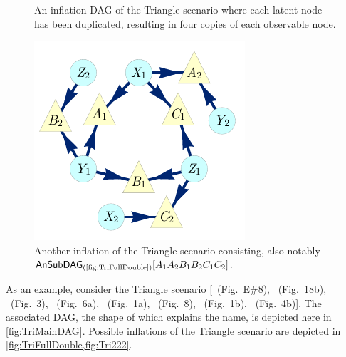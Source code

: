 \begin{figure}[t]
\begin{minipage}[t]{0.38\linewidth}
\caption{An inflation DAG of the Triangle scenario where each latent node has been duplicated, resulting in four copies of each observable node.}\label{fig:TriFullDouble}
\end{minipage}
\hfill
\begin{minipage}[b]{0.35\linewidth}
\centering
\includegraphics[scale=1]{TriDagSub222.pdf}
\caption{Another inflation of the Triangle scenario consisting, also notably $\ansubgraph[(\textrm{\cref{fig:TriFullDouble}})]{A_1 A_2 B_1 B_2 C_1 C_2}$.}\label{fig:Tri222}
\end{minipage}
\end{figure}



As an example, consider the Triangle scenario [\citealp{pusey2014gdag}~(Fig.~E\#8), \citealp{WoodSpekkens}~(Fig.~18b), \citealp{fritz2012bell}~(Fig.~3), \citealp{chaves2014novel}~(Fig.~6a), \citealp{Chaves2015infoquantum}~(Fig.~1a), \citealp{BilocalCorrelations}~(Fig.~8), \citealp{steudel2010ancestors}~(Fig.~1b), \citealp{chaves2014informationinference}~(Fig.~4b)]. The associated DAG, the shape of which explains the name, is depicted here in \cref{fig:TriMainDAG}. 
Possible inflations of the Triangle scenario are depicted in \cref{fig:TriFullDouble,fig:Tri222}.

